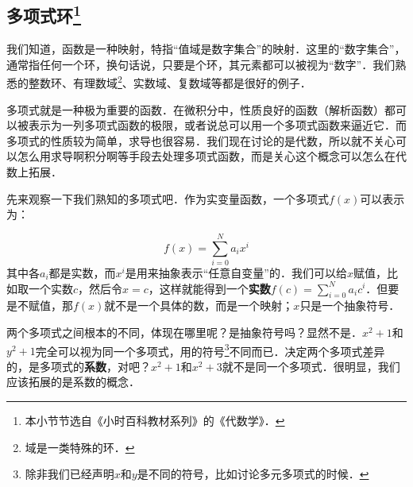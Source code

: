 

\subsection{多项式环\footnote{本小节节选自《小时百科教材系列》的《代数学》．}}
我们知道，函数是一种映射，特指“值域是数字集合”的映射．这里的“数字集合”，通常指任何一个环，换句话说，只要是个环，其元素都可以被视为“数字”．我们熟悉的整数环、有理数域\footnote{域是一类特殊的环．}、实数域、复数域等都是很好的例子．

多项式就是一种极为重要的函数．在微积分中，性质良好的函数（解析函数）都可以被表示为一列多项式函数的极限，或者说总可以用一个多项式函数来逼近它．而多项式的性质较为简单，求导也很容易．我们现在讨论的是代数，所以就不关心可以怎么用求导啊积分啊等手段去处理多项式函数，而是关心这个概念可以怎么在代数上拓展．

先来观察一下我们熟知的多项式吧．作为实变量函数，一个多项式$f(x)$可以表示为：

\begin{equation}
    f(x) = \sum_{i=0}^N a_i x^i
\end{equation}
其中各$a_i$都是实数，而$x^i$是用来抽象表示“任意自变量”的．我们可以给$x$赋值，比如取一个实数$c$，然后令$x=c$，这样就能得到一个\textbf{实数}$f(c)=\sum_{i=0}^N a_i c^i$．但要是不赋值，那$f(x)$就不是一个具体的数，而是一个映射；$x$只是一个抽象符号．

两个多项式之间根本的不同，体现在哪里呢？是抽象符号吗？显然不是．$x^2+1$和$y^2+1$完全可以视为同一个多项式，用的符号\footnote{除非我们已经声明$x$和$y$是不同的符号，比如讨论多元多项式的时候．}不同而已．决定两个多项式差异的，是多项式的\textbf{系数}，对吧？$x^2+1$和$x^2+3$就不是同一个多项式．很明显，我们应该拓展的是系数的概念．




